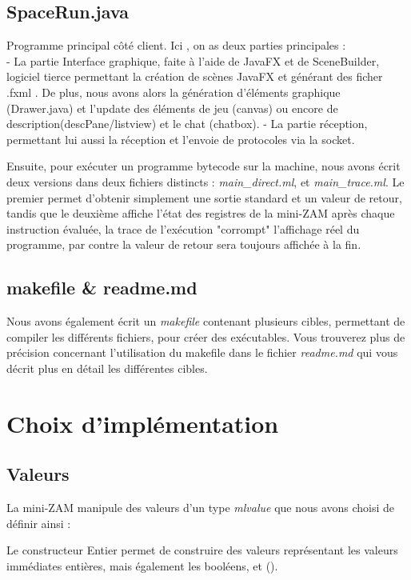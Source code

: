 \documentclass[11pt]{article}
\begin{document}
\subsection{SpaceRun.java}
Programme principal côté client. Ici , on as deux parties principales :\\
- La partie Interface graphique, faite à l'aide de JavaFX et de SceneBuilder, logiciel tierce permettant la création de scènes JavaFX et générant des ficher .fxml . De plus, nous avons alors la génération d'éléments graphique (Drawer.java) et l'update des éléments de jeu (canvas) ou encore de description(descPane/listview) et le chat (chatbox).
- La partie réception, permettant lui aussi la réception et l'envoie de protocoles via la socket.


Ensuite, pour exécuter un programme bytecode sur la machine, nous avons écrit deux versions dans deux fichiers distincts : {\em main\_direct.ml}, et {\em main\_trace.ml}. Le premier permet d'obtenir simplement une sortie standard et un valeur de retour, tandis que le deuxième affiche l'état des registres de la mini-ZAM après chaque instruction évaluée, la trace de l'exécution "corrompt" l'affichage réel du programme, par contre la valeur de retour sera toujours affichée à la fin.
\subsection{makefile \& readme.md}
Nous avons également écrit un {\em makefile} contenant plusieurs cibles, permettant de compiler les différents fichiers, pour créer des exécutables. Vous trouverez plus de précision concernant l'utilisation du makefile dans le fichier {\em readme.md} qui vous décrit plus en détail les différentes cibles.


\section{Choix d'implémentation}

\subsection{Valeurs}
La mini-ZAM manipule des valeurs d'un type {\em mlvalue} que nous avons choisi de définir ainsi :
%

\vspace{0.5cm}

Le constructeur Entier permet de construire des valeurs représentant les valeurs immédiates entières, mais également les booléens, et (). \\
\end{document}
